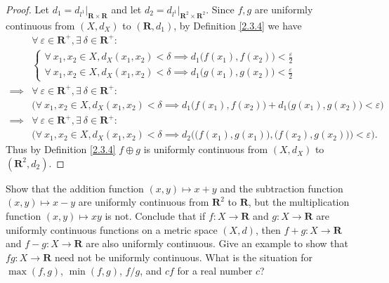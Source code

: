 \begin{proof}
    Let \(d_1 = d_{l^1}|_{\mathbf{R} \times \mathbf{R}}\) and let \(d_2 = d_{l^1}|_{\mathbf{R}^2 \times \mathbf{R}^2}\).
    Since \(f, g\) are uniformly continuous from \((X, d_X)\) to \((\mathbf{R}, d_1)\), by Definition \ref{2.3.4} we have
    \begin{align*}
                 & \forall\ \varepsilon \in \mathbf{R}^+, \exists\ \delta \in \mathbf{R}^+ :                                                                           \\
                 & \begin{cases}
            \forall\ x_1, x_2 \in X, d_X(x_1, x_2) < \delta \implies d_1\big(f(x_1), f(x_2)\big) < \frac{\varepsilon}{2} \\
            \forall\ x_1, x_2 \in X, d_X(x_1, x_2) < \delta \implies d_1\big(g(x_1), g(x_2)\big) < \frac{\varepsilon}{2}
        \end{cases}                                                                                                                          \\
        \implies & \forall\ \varepsilon \in \mathbf{R}^+, \exists\ \delta \in \mathbf{R}^+ :                                                                           \\
                 & \Big(\forall\ x_1, x_2 \in X, d_X(x_1, x_2) < \delta \implies d_1\big(f(x_1), f(x_2)\big) + d_1\big(g(x_1), g(x_2)\big) < \varepsilon\Big)          \\
        \implies & \forall\ \varepsilon \in \mathbf{R}^+, \exists\ \delta \in \mathbf{R}^+ :                                                                           \\
                 & \bigg(\forall\ x_1, x_2 \in X, d_X(x_1, x_2) < \delta \implies d_2\Big(\big(f(x_1), g(x_1)\big), \big(f(x_2), g(x_2)\big)\Big) < \varepsilon\bigg).
    \end{align*}
    Thus by Definition \ref{2.3.4} \(f \oplus g\) is uniformly continuous from \((X, d_X)\) to \((\mathbf{R}^2, d_2)\).
\end{proof}

\begin{exercise}\label{ex 2.3.6}
    Show that the addition function \((x, y) \mapsto x + y\) and the subtraction function \((x, y) \mapsto x - y\) are uniformly continuous from \(\mathbf{R}^2\) to \(\mathbf{R}\), but the multiplication function \((x, y) \mapsto xy\) is not.
    Conclude that if \(f : X \to \mathbf{R}\) and \(g : X \to \mathbf{R}\) are uniformly continuous functions on a metric space \((X, d)\), then \(f + g : X \to \mathbf{R}\) and \(f - g : X \to \mathbf{R}\) are also uniformly continuous.
    Give an example to show that \(fg : X \to \mathbf{R}\) need not be uniformly continuous.
    What is the situation for \(\max(f, g)\), \(\min(f, g)\), \(f / g\), and \(cf\) for a real number \(c\)?
\end{exercise}

